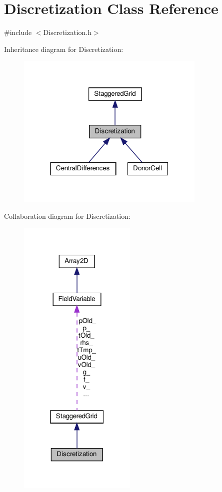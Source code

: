 \hypertarget{classDiscretization}{}\section{Discretization Class Reference}
\label{classDiscretization}


{\ttfamily \#include $<$Discretization.\+h$>$}



Inheritance diagram for Discretization\+:\nopagebreak
\begin{figure}[H]
\begin{center}
\leavevmode
\includegraphics[width=256pt]{classDiscretization__inherit__graph}
\end{center}
\end{figure}


Collaboration diagram for Discretization\+:\nopagebreak
\begin{figure}[H]
\begin{center}
\leavevmode
\includegraphics[width=159pt]{classDiscretization__coll__graph}
\end{center}
\end{figure}
